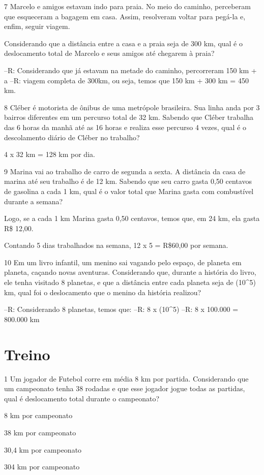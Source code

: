 {\num{7} Marcelo e amigos estavam indo para praia. No meio do caminho,
perceberam que esqueceram a bagagem em casa. Assim, resolveram voltar
para pegá-la e, enfim, seguir viagem.

Considerando que a distância entre a casa e a praia seja de 300 km, qual
é o deslocamento total de Marcelo e seus amigos até chegarem à praia?

--R: Considerando que já estavam na metade do caminho, percorreram 150 km + a
--R: viagem completa de 300km, ou seja, temos que 150 km + 300 km = 450 km.

\num{8} Cléber é motorista de ônibus de uma metrópole brasileira. Sua linha
anda por 3 bairros diferentes em um percurso total de 32 km. Sabendo que
Cléber trabalha das 6 horas da manhã até as 16 horas e realiza esse
percurso 4 vezes, qual é o descolamento diário de Cléber no trabalho?


4 x 32 km = 128 km por dia.

\num{9} Marina vai ao trabalho de carro de segunda a sexta. A distância da
casa de marina até seu trabalho é de 12 km. Sabendo que seu carro gasta
0,50 centavos de gasolina a cada 1 km, qual é o valor total que Marina
gasta com combustível durante a semana?


Logo, se a cada 1 km Marina gasta 0,50 centavos, temos que, em 24 km,
ela gasta R\$ 12,00.

Contando 5 dias trabalhados na semana, 12 x 5 = R\$60,00 por semana.

\num{10} Em um livro infantil, um menino sai vagando pelo espaço, de planeta
em planeta, caçando novas aventuras. Considerando que, durante a
história do livro, ele tenha visitado 8 planetas, e que a distância
entre cada planeta seja de (10^5) km, qual foi o deslocamento que o
menino da história realizou?

--R: Considerando 8 planetas, temos que:
--R: 8 x (10^5)
--R: 8 x 100.000 = 800.000 km

\section{Treino}

\num{1} Um jogador de Futebol corre em média 8 km por partida. Considerando
que um campeonato tenha 38 rodadas e que esse jogador jogue todas as
partidas, qual é deslocamento total durante o campeonato?
\item 8 km por campeonato
\item 38 km por campeonato
\item 30,4 km por campeonato
\item 304 km por campeonato

}
